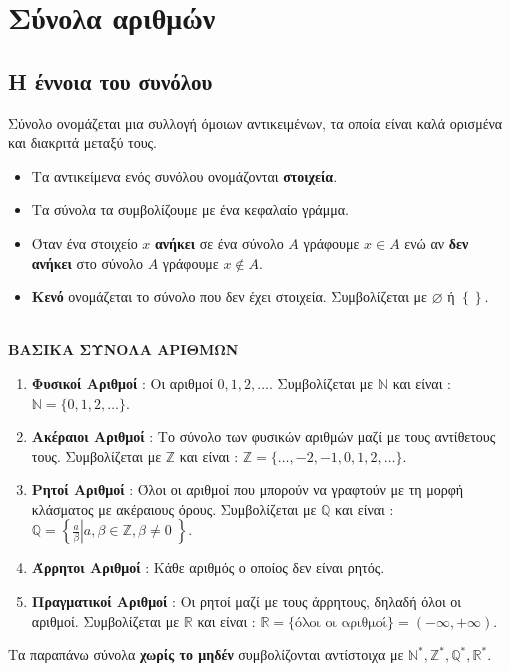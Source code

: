 \chapter{Σύνολα αριθμών}
\section{Η έννοια του συνόλου}
\orismoi
{} Σύνολο ονομάζεται μια συλλογή όμοιων αντικειμένων, τα οποία είναι καλά ορισμένα και διακριτά μεταξύ τους.
\begin{itemize}[itemsep=0mm]
\item Τα αντικείμενα ενός συνόλου ονομάζονται \textbf{στοιχεία}.
\item Τα σύνολα τα συμβολίζουμε με ένα κεφαλαίο γράμμα.
\item Όταν ένα στοιχείο $ x $ \textbf{ανήκει} σε ένα σύνολο $ A $ γράφουμε $ x\in A $ ενώ αν \textbf{δεν ανήκει} στο σύνολο $ A $ γράφουμε $ x\notin A $.
\item \textbf{Κενό} ονομάζεται το σύνολο που δεν έχει στοιχεία. Συμβολίζεται με $ \varnothing $ ή $ \left\lbrace \right\rbrace  $.
\end{itemize}\mbox{}\\
\textbf{ΒΑΣΙΚΑ ΣΥΝΟΛΑ ΑΡΙΘΜΩΝ}
\begin{enumerate}[itemsep=0mm,label=\bf\arabic*.]
\item \textbf{Φυσικοί Αριθμοί} : Οι αριθμοί $ 0,1,2,\ldots $. Συμβολίζεται με $ \mathbb{N} $ και είναι : $ \mathbb{N}=\{0,1,2,\ldots\} $.
\item \textbf{Ακέραιοι Αριθμοί} : Το σύνολο των φυσικών αριθμών μαζί με τους αντίθετους τους. Συμβολίζεται με $ \mathbb{Z} $ και είναι : $ \mathbb{Z}=\{\ldots,-2,-1,0,1,2,\ldots\} $.
\item \textbf{Ρητοί Αριθμοί} : Όλοι οι αριθμοί που μπορούν να γραφτούν με τη μορφή κλάσματος με ακέραιους όρους. Συμβολίζεται με $ \mathbb{Q} $ και είναι : $ \mathbb{Q}=\left\lbrace \left. \frac{a}{\beta}\right|a,\beta\in\mathbb{Z},\beta\neq0\;\right\rbrace  $.
\item \textbf{Άρρητοι Αριθμοί} : Κάθε αριθμός ο οποίος δεν είναι ρητός.
\item \textbf{Πραγματικοί Αριθμοί} : Οι ρητοί μαζί με τους άρρητους, δηλαδή όλοι οι αριθμοί. Συμβολίζεται με $ \mathbb{R} $ και είναι : $ \mathbb{R}=\{ \textrm{όλοι οι αριθμοί}\}=(-\infty,+\infty) $.
\end{enumerate}
Τα παραπάνω σύνολα \textbf{χωρίς το μηδέν} συμβολίζονται αντίστοιχα με $ \mathbb{N}^*,\mathbb{Z}^*,\mathbb{Q}^*,\mathbb{R}^*$.\\\\
